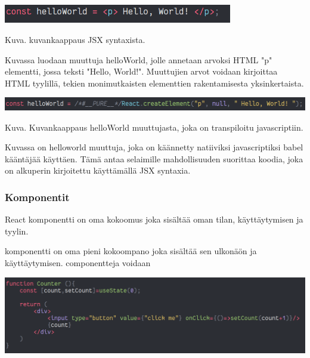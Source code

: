 \bigskip
\includegraphics[width=10cm]{src/public/oppar/pure_jsx_example.png}

Kuva\getImgCount .{} kuvankaappaus JSX syntaxista.
\medskip

Kuvassa luodaan muuttuja helloWorld, jolle annetaan arvoksi HTML "p"{} elementti, jossa teksti "Hello, World!"{}.
Muuttujien arvot voidaan kirjoittaa HTML tyylillä, tekien monimutkaisten elementtien rakentamisesta yksinkertaista.
\medskip



\bigskip
\includegraphics[width=15cm]{src/public/oppar/transpiled_jsx_example.png}

Kuva\getImgCount .{} Kuvankaappaus helloWorld muuttujasta, joka on transpiloitu javascriptiin. 
\medskip


Kuvassa on helloworld muuttuja, joka on käännetty natiiviksi javascriptiksi babel kääntäjää käyttäen.
Tämä antaa selaimille mahdollisuuden suorittaa koodia, joka on alkuperin kirjoitettu käyttämällä JSX syntaxia.
\medskip



\subsubsection{Komponentit}





React komponentti on oma kokoomus joka sisältää oman tilan, käyttäytymisen ja tyylin.

komponentti on oma pieni kokoompano joka sisältää sen ulkonäön ja käyttäytymisen. componentteja voidaan
\medskip
\bigskip

\includegraphics[width=15cm]{src/public/oppar/function_component.png}

